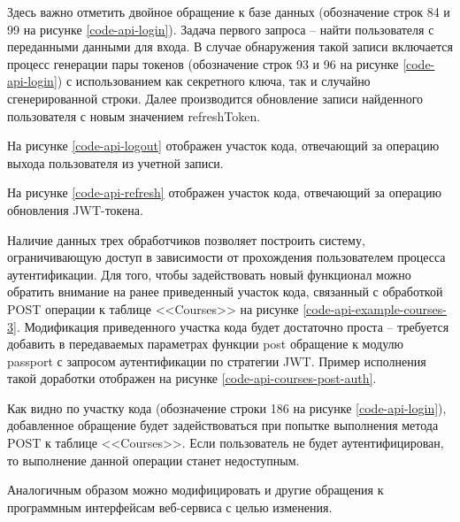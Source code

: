 
Здесь важно отметить двойное обращение к базе данных (обозначение строк 84 и 99 на рисунке \ref{code-api-login}).
Задача первого запроса -- найти пользователя с переданными данными для входа.
В случае обнаружения такой записи включается процесс генерации пары токенов (обозначение строк 93 и 96 на рисунке \ref{code-api-login}) с использованием как секретного ключа, так и случайно сгенерированной строки.
Далее производится обновление записи найденного пользователя с новым значением refreshToken.

На рисунке \ref{code-api-logout} отображен участок кода, отвечающий за операцию выхода пользователя из учетной записи.


На рисунке \ref{code-api-refresh} отображен участок кода, отвечающий за операцию обновления JWT-токена.


Наличие данных трех обработчиков позволяет построить систему, ограничивающую доступ в зависимости от прохождения пользователем процесса аутентификации.
Для того, чтобы задействовать новый функционал можно обратить внимание на ранее приведенный участок кода, связанный с обработкой POST операции к таблице <<Courses>> на рисунке \ref{code-api-example-courses-3}.
Модификация приведенного участка кода будет достаточно проста -- требуется добавить в передаваемых параметрах функции post обращение к модулю passport с запросом аутентификации по стратегии JWT.
Пример исполнения такой доработки отображен на рисунке \ref{code-api-courses-post-auth}.


Как видно по участку кода (обозначение строки 186 на рисунке \ref{code-api-login}), добавленное обращение будет задействоваться при попытке выполнения метода POST к таблице <<Courses>>.
Если пользователь не будет аутентифицирован, то выполнение данной операции станет недоступным.

Аналогичным образом можно модифицировать и другие обращения к программным интерфейсам веб-сервиса с целью изменения.



